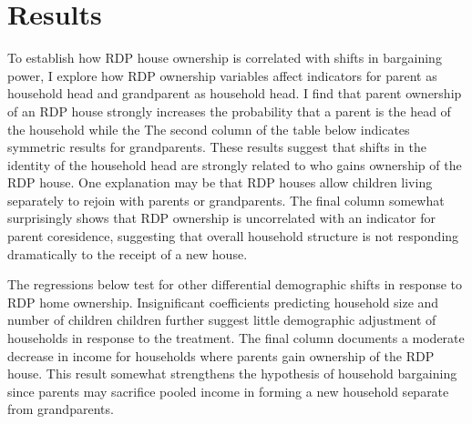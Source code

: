 \documentclass[11pt]{article} %
\begin{document}
\section*{Results}

To establish how RDP house ownership is correlated with shifts in bargaining power, I explore how RDP ownership variables affect indicators for parent as household head and grandparent as household head.  I find that parent ownership of an RDP house strongly increases the probability that a parent is the head of the household while the   The second column of the table below indicates symmetric results for grandparents.  These results suggest that shifts in the identity of the household head are strongly related to who gains ownership of the RDP house.  One explanation may be that RDP houses allow children living separately to rejoin with parents or grandparents.  The final column somewhat surprisingly shows that RDP ownership is uncorrelated with an indicator for parent coresidence, suggesting that overall household structure is not responding dramatically to the receipt of a new house.

\begin{center}
	
\end {center}

The regressions below test for other differential demographic shifts in response to RDP home ownership.  Insignificant coefficients predicting household size and number of children children further suggest little demographic adjustment of households in response to the treatment.  The final column documents a moderate decrease in income for households where parents gain ownership of the RDP house.  This result somewhat strengthens the hypothesis of household bargaining since parents may sacrifice pooled income in forming a new household separate from grandparents.  

\begin{center}
	
\end {center}
\end{document}
